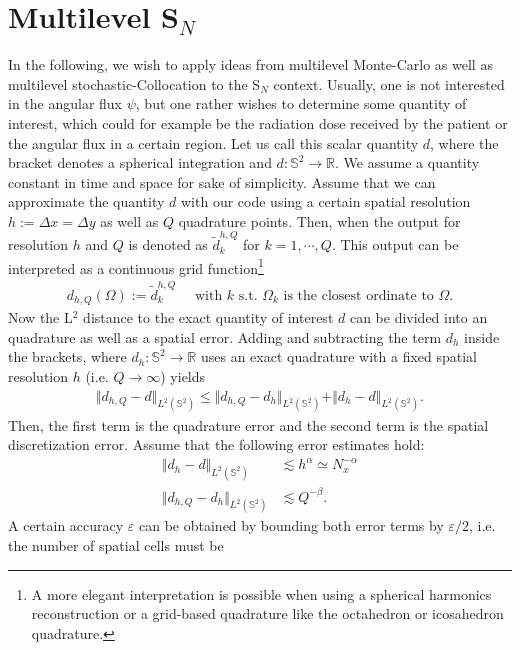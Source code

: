 \documentclass[10pt,a4paper]{article}
\begin{document}
\section{Multilevel S$_N$}
In the following, we wish to apply ideas from multilevel Monte-Carlo as well as multilevel stochastic-Collocation to the S$_N$ context. Usually, one is not interested in the angular flux $\psi$, but one rather wishes to determine some quantity of interest, which could for example be the radiation dose received by the patient or the angular flux in a certain region. Let us call this scalar quantity $d$, where the bracket denotes a spherical integration and $d:\mathbb{S}^2\rightarrow\mathbb{R}$. We assume a quantity constant in time and space for sake of simplicity. Assume that we can approximate the quantity $d$ with our code using a certain spatial resolution $h:=\Delta x = \Delta y$ as well as $Q$ quadrature points. Then, when the output for resolution $h$ and $Q$ is denoted as $\tilde d^{h,Q}_k$ for $k = 1,\cdots,Q$. This output can be interpreted as a continuous grid function\footnote{A more elegant interpretation is possible when using a spherical harmonics reconstruction or a grid-based quadrature like the octahedron or icosahedron quadrature.}
\begin{align*}
d_{h,Q}(\Omega) := \tilde d^{h,Q}_k \quad \text{ with $k$ s.t. $\Omega_k$ is the closest ordinate to }\Omega.
\end{align*}
Now the L$^2$ distance to the exact quantity of interest $d$ can be divided into an quadrature as well as a spatial error. Adding and subtracting the term $d_{h}$ inside the brackets, where $d_h:\mathbb{S}^2\rightarrow\mathbb{R}$ uses an exact quadrature with a fixed spatial resolution $h$ (i.e. $Q\rightarrow\infty$) yields
\begin{align*}
\Vert d_{h,Q} - d \Vert_{L^{2}(\mathbb{S}^2)} \leq \Vert d_{h,Q} - d_{h} \Vert_{L^{2}(\mathbb{S}^2)}+\Vert d_{h} - d \Vert_{L^{2}(\mathbb{S}^2)}.
\end{align*}
Then, the first term is the quadrature error and the second term is the spatial discretization error. Assume that the following error estimates hold:
\begin{align*}
\Vert d_{h} - d \Vert_{L^{2}(\mathbb{S}^2)} &\lesssim h^{\alpha} \simeq N_x^{-\alpha} \\
\Vert d_{h,Q} - d_{h} \Vert_{L^{2}(\mathbb{S}^2)} &\lesssim Q^{-\beta}.
\end{align*}
A certain accuracy $\varepsilon$ can be obtained by bounding both error terms by $\varepsilon/2$, i.e. the number of spatial cells must be
\end{document}
